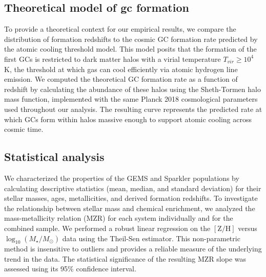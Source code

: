 \documentclass[]{article}
\begin{document}
\subsection{Theoretical model of gc formation}
To provide a theoretical context for our empirical results, we compare the distribution of formation redshifts to the cosmic GC formation rate predicted by the atomic cooling threshold model. This model posits that the formation of the first GCs is restricted to dark matter halos with a virial temperature $T_{vir} \geq 10^4$ K, the threshold at which gas can cool efficiently via atomic hydrogen line emission. We computed the theoretical GC formation rate as a function of redshift by calculating the abundance of these halos using the Sheth-Tormen halo mass function, implemented with the same Planck 2018 cosmological parameters used throughout our analysis. The resulting curve represents the predicted rate at which GCs form within halos massive enough to support atomic cooling across cosmic time.

\subsection{Statistical analysis}
We characterized the properties of the GEMS and Sparkler populations by calculating descriptive statistics (mean, median, and standard deviation) for their stellar masses, ages, metallicities, and derived formation redshifts. To investigate the relationship between stellar mass and chemical enrichment, we analyzed the mass-metallicity relation (MZR) for each system individually and for the combined sample. We performed a robust linear regression on the $[\mathrm{Z/H}]$ versus $\log_{10}(M_\star/M_\odot)$ data using the Theil-Sen estimator. This non-parametric method is insensitive to outliers and provides a reliable measure of the underlying trend in the data. The statistical significance of the resulting MZR slope was assessed using its 95\% confidence interval.
\end{document}
